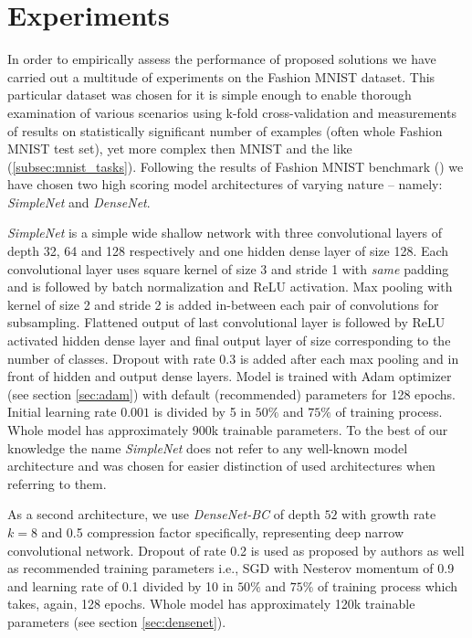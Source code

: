 \chapter{Experiments}
\label{sec:experiments}
In order to empirically assess the performance of proposed solutions we have carried out a multitude of experiments on the Fashion MNIST dataset. This particular dataset was chosen for it is simple enough to enable thorough examination of various scenarios using k-fold cross-validation and measurements of results on statistically significant number of examples (often whole Fashion MNIST test set), yet more complex then MNIST and the like (\ref{subsec:mnist_tasks}). Following the results of Fashion MNIST benchmark (\cite{FASHION_BENCH}) we have chosen two high scoring model architectures of varying nature -- namely: \emph{SimpleNet} and \emph{DenseNet}.

\emph{SimpleNet} is a simple wide shallow network with three convolutional layers of depth 32, 64 and 128 respectively and one hidden dense layer of size 128. Each convolutional layer uses square kernel of size 3 and stride 1 with \textit{same} padding and is followed by batch normalization and ReLU activation. Max pooling with kernel of size 2 and stride 2 is added in-between each pair of convolutions for subsampling. Flattened output of last convolutional layer is followed by ReLU activated hidden dense layer and final output layer of size corresponding to the number of classes. Dropout with rate $0.3$ is added after each max pooling and in front of hidden and output dense layers. Model is trained with Adam optimizer (see section \ref{sec:adam}) with default (recommended) parameters for 128 epochs. Initial learning rate $0.001$ is divided by 5 in $50\%$ and $75\%$ of training process. Whole model has approximately 900k trainable parameters. To the best of our knowledge the name \emph{SimpleNet} does not refer to any well-known model architecture and was chosen for easier distinction of used architectures when referring to them.

As a second architecture, we use \emph{DenseNet-BC} of depth $52$ with growth rate $k=8$ and 0.5 compression factor specifically, representing deep narrow convolutional network. Dropout of rate 0.2 is used as proposed by authors as well as recommended training parameters i.e., SGD with Nesterov momentum of 0.9 and learning rate of 0.1 divided by 10 in $50\%$ and $75\%$ of training process which takes, again, 128 epochs. Whole model has approximately 120k trainable parameters (see section \ref{sec:densenet}).

